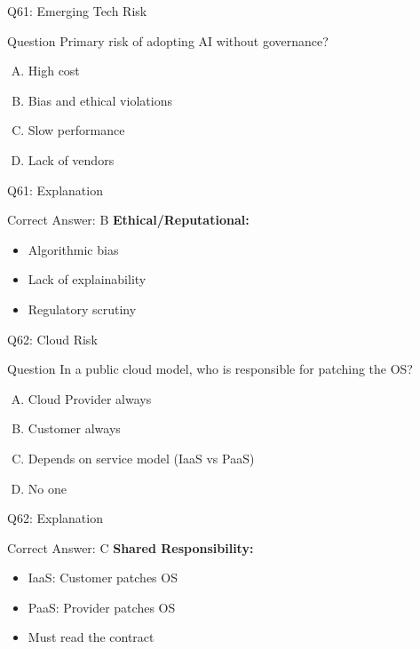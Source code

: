 \documentclass{beamer}
\begin{document}
			\begin{frame}{Q61: Emerging Tech Risk}
				\begin{block}{Question}
					Primary risk of adopting AI without governance?
				\end{block}
				\begin{enumerate}[(A)]
					\item High cost
					\item Bias and ethical violations
					\item Slow performance
					\item Lack of vendors
				\end{enumerate}
			\end{frame}
			\begin{frame}{Q61: Explanation}
				\begin{block}{Correct Answer: B}
					\textbf{Ethical/Reputational:}
					\begin{itemize}
						\item Algorithmic bias
						\item Lack of explainability
						\item Regulatory scrutiny
					\end{itemize}
				\end{block}
			\end{frame}
			
			\begin{frame}{Q62: Cloud Risk}
				\begin{block}{Question}
					In a public cloud model, who is responsible for patching the OS?
				\end{block}
				\begin{enumerate}[(A)]
					\item Cloud Provider always
					\item Customer always
					\item Depends on service model (IaaS vs PaaS)
					\item No one
				\end{enumerate}
			\end{frame}
			\begin{frame}{Q62: Explanation}
				\begin{block}{Correct Answer: C}
					\textbf{Shared Responsibility:}
					\begin{itemize}
						\item IaaS: Customer patches OS
						\item PaaS: Provider patches OS
						\item Must read the contract
					\end{itemize}
				\end{block}
			\end{frame}
			
\end{document}
